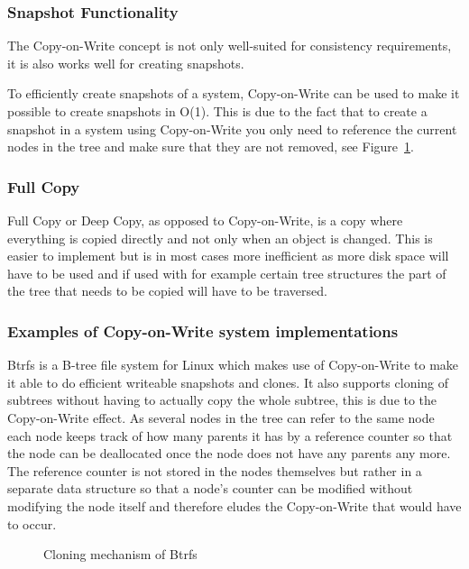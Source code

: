 \documentclass[a4paper,12pt]{article}
\newcounter{subsubsubsection}[subsubsection]
\begin{document}
\subsubsection{Snapshot Functionality}
The Copy-on-Write concept is not only well-suited for consistency requirements, it is also works 
well for creating snapshots.

To efficiently create snapshots of a system, Copy-on-Write can be used to make it possible to create
snapshots in O(1)\cite{BTRFS}. This is due to the fact that to create a snapshot in a system using
Copy-on-Write you only need to reference the current nodes in the tree and make sure that they are
not removed, see Figure~\ref{fig:btrfs_tree}.

\subsubsection{Full Copy}
Full Copy or Deep Copy, as opposed to Copy-on-Write, is a copy where everything is copied directly
and not only when an object is changed. This is easier to implement but is in most cases more
inefficient as more disk space will have to be used and if used with for example certain tree 
structures the part of the tree that needs to be copied will have to be traversed. 

\subsubsection{Examples of Copy-on-Write system implementations}
 \label{sec:btrfs}
Btrfs is a B-tree file system for Linux which makes use of Copy-on-Write to make it able to do
efficient writeable snapshots and clones. It also supports cloning of subtrees without having to
actually copy the whole subtree, this is due to the Copy-on-Write effect. As several nodes in the
tree can refer to the same node each node keeps track of how many parents it has by a reference
counter so that the node can be deallocated once the node does not have any parents any more. The
reference counter is not stored in the nodes themselves but rather in a separate data structure so
that a node's counter can be modified without modifying the node itself and therefore eludes the
Copy-on-Write that would have to occur.

\begin{figure}[H] 
    \caption{Cloning mechanism of Btrfs~\cite{BTRFS}}
    \label{fig:btrfs_tree}
\end{figure}
\end{document}
